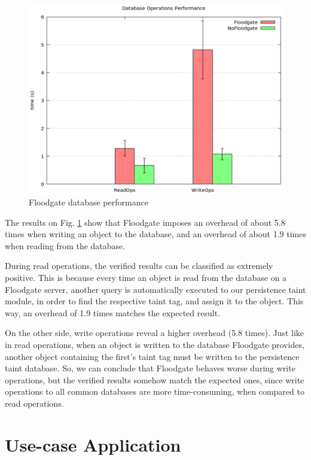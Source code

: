 \begin{figure}[t!]
\includegraphics[width=\textwidth]{figs/database-performance}
\centering
\caption{Floodgate database performance}
\label{fig:database-performance}
\end{figure}

The results on Fig. \ref{fig:database-performance} show that Floodgate imposes an overhead of about 5.8 times when writing an object to the database, and an overhead of about 1.9 times when reading from the database.

During read operations, the verified results can be classified as extremely positive. This is because every time an object is read from the database on a Floodgate server, another query is automatically executed to our persistence taint module, in order to find the respective taint tag, and assign it to the object. This way, an overhead of 1.9 times matches the expected result. 

On the other side, write operations reveal a higher overhead (5.8 times). Just like in read operations, when an object is written to the database Floodgate provides, another object containing the first's taint tag must be written to the persistence taint database. So, we can conclude that Floodgate behaves worse during write operations, but the verified results somehow match the expected ones, since write operations to all common databases are more time-consuming, when compared to read operations.

\section{Use-case Application}

